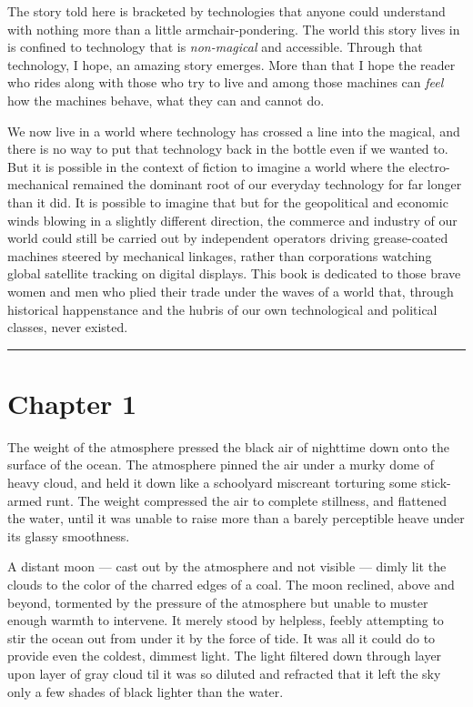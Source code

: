 \documentclass[
]{scrbook}
\begin{document}
The story told here is bracketed by technologies that anyone could
understand with nothing more than a little armchair-pondering. The world
this story lives in is confined to technology that is \emph{non-magical}
and accessible. Through that technology, I hope, an amazing story
emerges. More than that I hope the reader who rides along with those who
try to live and among those machines can \emph{feel} how the machines
behave, what they can and cannot do.

We now live in a world where technology has crossed a line into the
magical, and there is no way to put that technology back in the bottle
even if we wanted to. But it is possible in the context of fiction to
imagine a world where the electro-mechanical remained the dominant root
of our everyday technology for far longer than it did. It is possible to
imagine that but for the geopolitical and economic winds blowing in a
slightly different direction, the commerce and industry of our world
could still be carried out by independent operators driving
grease-coated machines steered by mechanical linkages, rather than
corporations watching global satellite tracking on digital displays.
This book is dedicated to those brave women and men who plied their
trade under the waves of a world that, through historical happenstance
and the hubris of our own technological and political classes, never
existed.

\begin{center}\rule{0.5\linewidth}{0.5pt}\end{center}

\hypertarget{chapter-1}{%
\chapter*{Chapter 1}\label{chapter-1}}

The weight of the atmosphere pressed the black air of nighttime down
onto the surface of the ocean. The atmosphere pinned the air under a
murky dome of heavy cloud, and held it down like a schoolyard miscreant
torturing some stick-armed runt. The weight compressed the air to
complete stillness, and flattened the water, until it was unable to
raise more than a barely perceptible heave under its glassy smoothness.

A distant moon --- cast out by the atmosphere and not visible --- dimly
lit the clouds to the color of the charred edges of a coal. The moon
reclined, above and beyond, tormented by the pressure of the atmosphere
but unable to muster enough warmth to intervene. It merely stood by
helpless, feebly attempting to stir the ocean out from under it by the
force of tide. It was all it could do to provide even the coldest,
dimmest light. The light filtered down through layer upon layer of gray
cloud til it was so diluted and refracted that it left the sky only a
few shades of black lighter than the water.
\end{document}

